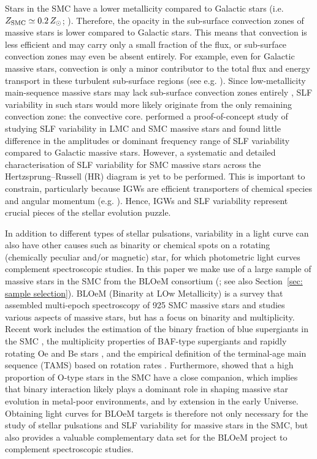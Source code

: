 \documentclass[fleqn,usenatbib]{mnras}
\begin{document}
Stars in the SMC have a lower metallicity compared to Galactic stars (i.e. $Z_{\rm SMC} \simeq 0.2\,Z_{\odot}$; \citealt{Hunter+2007}). Therefore, the opacity in the sub-surface convection zones of massive stars is lower compared to Galactic stars. This means that convection is less efficient and may carry only a small fraction of the flux, or sub-surface convection zones may even be absent entirely. For example, even for Galactic massive stars, convection is only a minor contributor to the total flux and energy transport in these turbulent sub-surface regions (see e.g. \citealt{Debnath+2024}). Since low-metallicity main-sequence massive stars may lack sub-surface convection zones entirely \citep{Jermyn+2022, BowmanVanDaele2024}, SLF variability in such stars would more likely originate from the only remaining convection zone: the convective core. \citet{BowmanVanDaele2024} performed a proof-of-concept study of studying SLF variability in LMC and SMC massive stars and found little difference in the amplitudes or dominant frequency range of SLF variability compared to Galactic massive stars. However, a systematic and detailed characterisation of SLF variability for SMC massive stars across the Hertzsprung--Russell (HR) diagram is yet to be performed. This is important to constrain, particularly because IGWs are efficient transporters of chemical species and angular momentum (e.g. \citealt{Rogers+2017, Rogers2025, Varghese2025}). Hence, IGWs and SLF variability represent crucial pieces of the stellar evolution puzzle.

In addition to different types of stellar pulsations, variability in a light curve can also have other causes such as binarity or chemical spots on a rotating (chemically peculiar and/or magnetic) star, for which photometric light curves complement spectroscopic studies. In this paper we make use of a large sample of massive stars in the SMC from the BLOeM consortium (\citealt{BLOeM2024}; see also Section~\ref{sec: sample selection}). BLOeM (Binarity at LOw Metallicity) is a survey that assembled multi-epoch spectroscopy of 925 SMC massive stars and studies various aspects of massive stars, but has a focus on binarity and multiplicity. Recent work includes the estimation of the binary fraction of blue supergiants in the SMC \citep{Britavskiy+2025}, the multiplicity properties of BAF-type supergiants \citep{Patrick+2025} and rapidly rotating Oe and Be stars \citep{Bodensteiner+2025}, and the empirical definition of the terminal-age main sequence (TAMS) based on rotation rates \citep{Lennon+2026}. Furthermore, \citet{Sana+2025NatAs} showed that a high proportion of O‑type stars in the SMC have a close companion, which implies that binary interaction likely plays a dominant role in shaping massive star evolution in metal-poor environments, and by extension in the early Universe. Obtaining light curves for BLOeM targets is therefore not only necessary for the study of stellar pulsations and SLF variability for massive stars in the SMC, but also provides a valuable complementary data set for the BLOeM project to complement spectroscopic studies.
\end{document}
